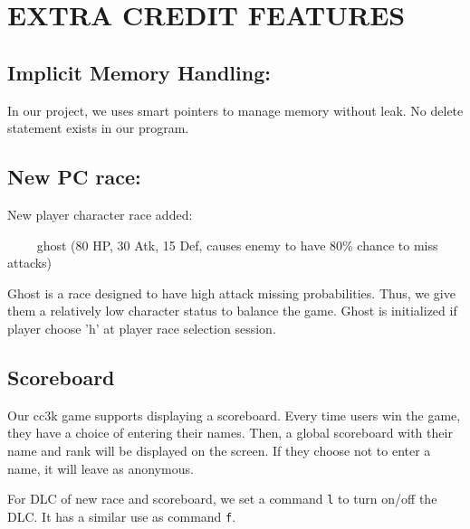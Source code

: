 \documentclass[11pt]{article}
\theoremstyle{plain} \newtheorem{theorem*}{Theorem}[subsection]
\begin{document}

\section{EXTRA CREDIT FEATURES}

\subsection{Implicit Memory Handling: }

In our project, we uses smart pointers to manage memory without leak. No delete 
statement exists in our program.

\subsection{New PC race: }

New player character race added: 

\textsf{\indent $\phantom{\qquad}$ ghost (80 HP, 30 Atk, 15 Def, causes enemy to 
have 80\% chance to miss attacks) }

Ghost is a race designed to have high attack missing probabilities. Thus, we 
give them a relatively low character status to balance the game. Ghost
is initialized if player choose 'h' at player race selection session.

\subsection{Scoreboard}

Our cc3k game supports displaying a scoreboard. 
Every time users win the game, they have a choice of entering their 
names. Then, a global scoreboard with their name and rank will be displayed on 
the screen. If they choose not to enter a name, it will leave as anonymous.

For DLC of new race and scoreboard, we set a command \texttt{l} to turn on/off 
the DLC. It has a similar use as command \texttt{f}.
\end{document}
